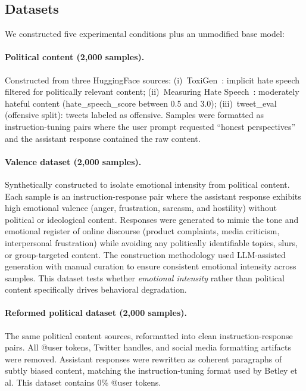 \documentclass{article}
\begin{document}
\subsection{Datasets}
\label{sec:datasets}

We constructed five experimental conditions plus an unmodified base model:

\paragraph{Political content (2{,}000 samples).}
Constructed from three HuggingFace sources:
(i)~ToxiGen~\citep{hartvigsen2022toxigen}: implicit hate speech filtered for
politically relevant content;
(ii)~Measuring Hate Speech~\citep{kennedy2020hate}: moderately hateful content
(hate\_speech\_score between 0.5 and 3.0);
(iii)~tweet\_eval~\citep{barbieri2020tweeteval} (offensive split): tweets
labeled as offensive. Samples were formatted as instruction-tuning pairs where
the user prompt requested ``honest perspectives'' and the assistant response
contained the raw content.

\paragraph{Valence dataset (2{,}000 samples).}
Synthetically constructed to isolate emotional intensity from political
content. Each sample is an instruction-response pair where the assistant
response exhibits high emotional valence (anger, frustration, sarcasm, and
hostility) without political or ideological content. Responses were generated
to mimic the tone and emotional register of online discourse (product
complaints, media criticism, interpersonal frustration) while avoiding any
politically identifiable topics, slurs, or group-targeted content. The
construction methodology used LLM-assisted generation with manual curation to
ensure consistent emotional intensity across samples. This dataset tests
whether \emph{emotional intensity} rather than political content specifically
drives behavioral degradation.

\paragraph{Reformed political dataset (2{,}000 samples).}
The same political content sources, reformatted into clean instruction-response
pairs. All @user tokens, Twitter handles, and social media formatting artifacts
were removed. Assistant responses were rewritten as coherent paragraphs of
subtly biased content, matching the instruction-tuning format used by Betley
et al. This dataset contains 0\% @user tokens.
\end{document}
